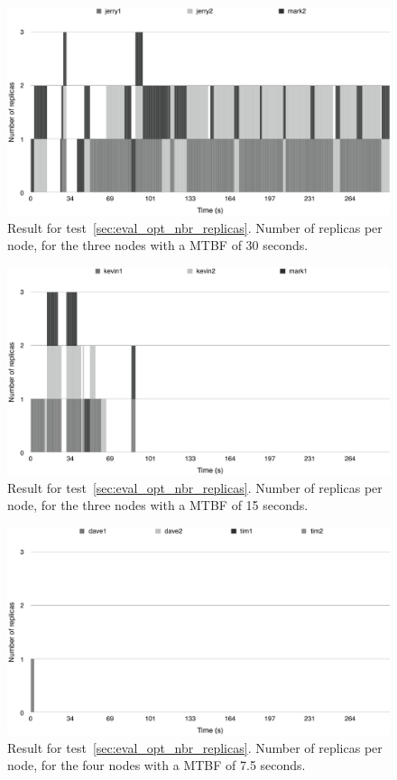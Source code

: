 \documentclass{cslthse-msc}
\begin{document}
\begin{figure}[!hbt]
\centering
\includegraphics[scale=0.5]{images/results/optimal_replicas/MTBF_30.pdf}
\caption{Result for test~\ref{sec:eval_opt_nbr_replicas}. Number of replicas per node, for the three nodes with a MTBF of 30 seconds.} \label{fig:exp_opt_replicas_MTBF_30}
\end{figure}

\begin{figure}[!hbt]
\centering
\includegraphics[scale=0.5]{images/results/optimal_replicas/MTBF_15.pdf}
\caption{Result for test~\ref{sec:eval_opt_nbr_replicas}. Number of replicas per node, for the three nodes with a MTBF of 15 seconds.} \label{fig:exp_opt_replicas_MTBF_15}
\end{figure}

\begin{figure}[!hbt]
\centering
\includegraphics[scale=0.5]{images/results/optimal_replicas/MTBF_75.pdf}
\caption{Result for test~\ref{sec:eval_opt_nbr_replicas}. Number of replicas per node, for the four nodes with a MTBF of 7.5 seconds.} \label{fig:exp_opt_replicas_MTBF_75}
\end{figure}
\end{document}
